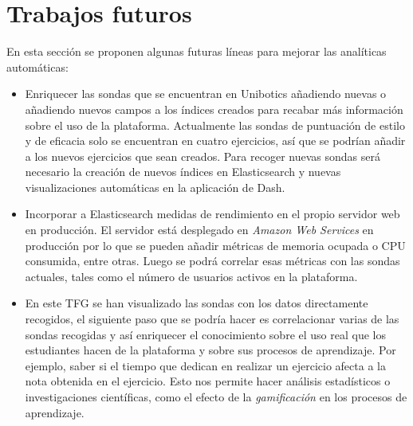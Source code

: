	\section{Trabajos futuros} 
	\label{sec:trabajos_futuros} 

		En esta sección se proponen algunas futuras líneas para mejorar las analíticas automáticas:

		\begin{itemize}
\item Enriquecer las sondas que se encuentran en Unibotics añadiendo nuevas o añadiendo nuevos campos a los índices creados para recabar más información sobre el uso de la plataforma. Actualmente las sondas de puntuación de estilo y de eficacia solo se encuentran en cuatro ejercicios, así que se podrían añadir a los nuevos ejercicios que sean creados. Para recoger nuevas sondas será necesario la creación de nuevos índices en Elasticsearch y nuevas visualizaciones automáticas en la aplicación de Dash.
\item Incorporar a Elasticsearch medidas de rendimiento en el propio servidor web en producción. El servidor está desplegado en \textit{Amazon Web Services} en producción por lo que se pueden añadir métricas de memoria ocupada o CPU consumida, entre otras. Luego se podrá correlar esas métricas con las sondas actuales, tales como el número de usuarios activos en la plataforma.
\item En este TFG se han visualizado las sondas con los datos directamente recogidos, el siguiente paso que se podría hacer es correlacionar varias de las sondas recogidas y así enriquecer el conocimiento sobre el uso real que los estudiantes hacen de la plataforma y sobre sus procesos de aprendizaje. Por ejemplo, saber si el tiempo que dedican en realizar un ejercicio afecta a la nota obtenida en el ejercicio. Esto nos permite hacer análisis estadísticos o investigaciones científicas, como el efecto de la \textit{gamificación} en los procesos de aprendizaje.\\
		\end{itemize}